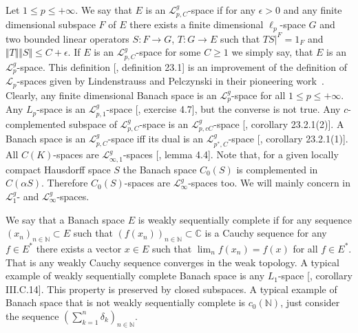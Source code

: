 Let $1\leq p\leq +\infty$. We say that $E$ is an $\mathscr{L}_{p,C}^g$-space if
for any $\epsilon>0$ and any finite dimensional subspace $F$ of $E$ there exists
a finite dimensional $\ell_p$-space $G$ and two bounded linear operators 
$S:F\to G$, $T:G\to E$ such that $TS|^F=1_F$ and 
$\Vert T\Vert\Vert S\Vert\leq C+\epsilon$. 
If $E$ is an $\mathscr{L}_{p,C}^g$-space for some $C\geq 1$ we
simply say, that $E$ is an $\mathscr{L}_p^g$-space. This definition
[\cite{DefFloTensNorOpId}, definition 23.1] is an improvement of the definition
of $\mathscr{L}_p$-spaces given by Lindenstrauss and Pelczynski in their
pioneering work~\cite{LinPelAbsSumOpInLpSpAndApp}. Clearly, any finite
dimensional Banach space is an $\mathscr{L}_p^g$-space for 
all $1\leq p\leq +\infty$. Any $L_p$-space is an $\mathscr{L}_{p,1}^g$-space
[\cite{DefFloTensNorOpId}, exercise 4.7], but the converse is not true. Any
$c$-complemented subspace of $\mathscr{L}_{p,C}^g$-space is an
$\mathscr{L}_{p,cC}^g$-space [\cite{DefFloTensNorOpId}, corollary 23.2.1(2)]. A
Banach space is an $\mathscr{L}_{p,C}^g$-space iff its dual is an
$\mathscr{L}_{p^*,C}^g$-space [\cite{DefFloTensNorOpId}, corollary 23.2.1(1)].
All $C(K)$-spaces are $\mathscr{L}_{\infty, 1}^g$-spaces
[\cite{DefFloTensNorOpId}, lemma 4.4]. Note that, for a given locally compact
Hausdorff space $S$ the Banach space $C_0(S)$ is complemented in $C(\alpha S)$.
Therefore $C_0(S)$-spaces are $\mathscr{L}_\infty^g$-spaces too. We will mainly
concern in $\mathscr{L}_1^g$- and $\mathscr{L}_\infty^g$-spaces.

We say that a Banach space $E$ is weakly sequentially complete if for any
sequence ${(x_n)}_{n\in\mathbb{N}}\subset E$ such that
${(f(x_n))}_{n\in\mathbb{N}}\subset\mathbb{C}$ is a Cauchy sequence for 
any $f\in E^*$ there exists a vector $x\in E$ 
such that $\lim_n f(x_n)=f(x)$ for all $f\in E^*$. That is any weakly 
Cauchy sequence converges in the weak topology. A typical example of weakly 
sequentially complete Banach space is any $L_1$-space
[\cite{WojBanSpForAnalysts}, corollary III.C.14]. This property is preserved by
closed subspaces. A typical example of Banach space that is not weakly
sequentially complete is $c_0(\mathbb{N})$, just consider the sequence
${(\sum_{k=1}^n \delta_k)}_{n\in\mathbb{N}}$.

